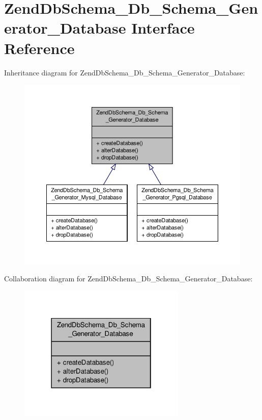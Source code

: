 \hypertarget{interfaceZendDbSchema__Db__Schema__Generator__Database}{\section{Zend\-Db\-Schema\-\_\-\-Db\-\_\-\-Schema\-\_\-\-Generator\-\_\-\-Database Interface Reference}
\label{interfaceZendDbSchema__Db__Schema__Generator__Database}
}


Inheritance diagram for Zend\-Db\-Schema\-\_\-\-Db\-\_\-\-Schema\-\_\-\-Generator\-\_\-\-Database\-:\nopagebreak
\begin{figure}[H]
\begin{center}
\leavevmode
\includegraphics[width=350pt]{interfaceZendDbSchema__Db__Schema__Generator__Database__inherit__graph}
\end{center}
\end{figure}


Collaboration diagram for Zend\-Db\-Schema\-\_\-\-Db\-\_\-\-Schema\-\_\-\-Generator\-\_\-\-Database\-:\nopagebreak
\begin{figure}[H]
\begin{center}
\leavevmode
\includegraphics[width=226pt]{interfaceZendDbSchema__Db__Schema__Generator__Database__coll__graph}
\end{center}
\end{figure}
